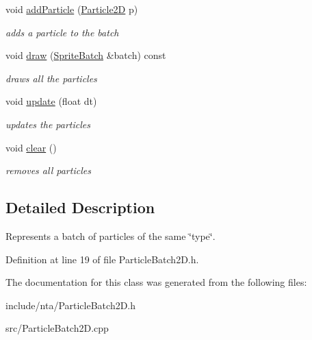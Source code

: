 \begin{DoxyCompactItemize}
\mbox{\label{classnta_1_1ParticleBatch2D_aeb80340cf60145569e7d30e5e25fd9c0}} 
void \hyperlink{classnta_1_1ParticleBatch2D_aeb80340cf60145569e7d30e5e25fd9c0}{add\+Particle} (\hyperlink{structnta_1_1Particle2D}{Particle2D} p)
\begin{DoxyCompactList}\small\item\em adds a particle to the batch \end{DoxyCompactList}\item 
\mbox{\label{classnta_1_1ParticleBatch2D_a270e573b2a767bf32fde34d17d838e69}} 
void \hyperlink{classnta_1_1ParticleBatch2D_a270e573b2a767bf32fde34d17d838e69}{draw} (\hyperlink{classnta_1_1SpriteBatch}{Sprite\+Batch} \&batch) const
\begin{DoxyCompactList}\small\item\em draws all the particles \end{DoxyCompactList}\item 
\mbox{\label{classnta_1_1ParticleBatch2D_a55d3f2b663039bb95e847f0770c864cf}} 
void \hyperlink{classnta_1_1ParticleBatch2D_a55d3f2b663039bb95e847f0770c864cf}{update} (float dt)
\begin{DoxyCompactList}\small\item\em updates the particles \end{DoxyCompactList}\item 
\mbox{\label{classnta_1_1ParticleBatch2D_a1046b22d239222435e74011b3683a5c6}} 
void \hyperlink{classnta_1_1ParticleBatch2D_a1046b22d239222435e74011b3683a5c6}{clear} ()
\begin{DoxyCompactList}\small\item\em removes all particles \end{DoxyCompactList}\end{DoxyCompactItemize}


\subsection{Detailed Description}
Represents a batch of particles of the same \char`\"{}type\char`\"{}. 

Definition at line 19 of file Particle\+Batch2\+D.\+h.



The documentation for this class was generated from the following files\+:\begin{DoxyCompactItemize}
\item 
include/nta/Particle\+Batch2\+D.\+h\item 
src/Particle\+Batch2\+D.\+cpp\end{DoxyCompactItemize}

